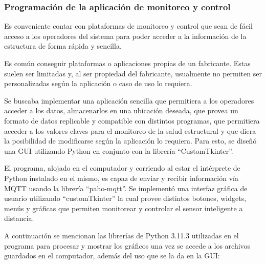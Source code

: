 \subsubsection{Programación de la aplicación de monitoreo y control}

Es conveniente contar con plataformas de monitoreo y control que sean de fácil acceso a los operadores del sistema para poder acceder a la información de la estructura de forma rápida y sencilla. 

Es común conseguir plataformas o aplicaciones propias de un fabricante. Estas suelen ser limitadas y, al ser propiedad del fabricante, usualmente no permiten ser personalizadas según la aplicación o caso de uso lo requiera.

Se buscaba implementar una aplicación sencilla que permitiera a los operadores acceder a los datos, almacenarlos en una ubicación deseada, que provea un formato de datos replicable y compatible con distintos programas, que permitiera acceder a los valores claves para el monitoreo de la salud estructural y que diera la posibilidad de modificarse según la aplicación lo requiera. Para esto, se diseñó una GUI utilizando Python en conjunto con la librería ``CustomTkinter''.

El programa, alojado en el computador y corriendo al estar el intérprete de Python instalado en el mismo, es capaz de enviar y recibir información vía MQTT usando la librería ``paho-mqtt''. Se implementó una interfaz gráfica de usuario utilizando ``customTkinter'' la cual provee distintos botones, widgets, menús y gráficas que permiten monitorear y controlar el sensor inteligente a distancia. 

A continuación se mencionan las librerías de Python 3.11.3 utilizadas en el programa para procesar y mostrar los gráficos una vez se accede a los archivos guardados en el computador, además del uso que se la da en la GUI:

